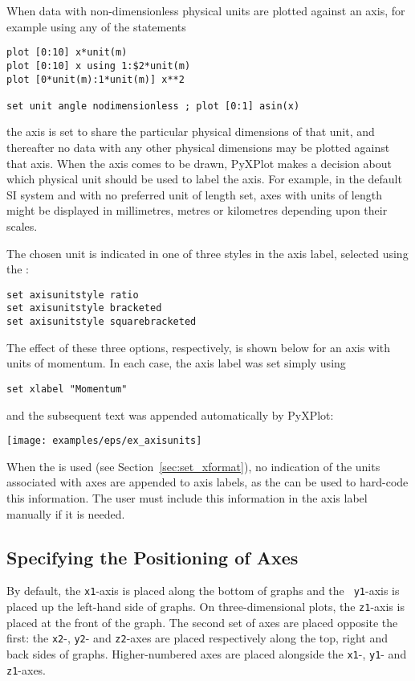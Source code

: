 When data with non-dimensionless physical units are plotted against an axis,
for example using any of the statements
\begin{verbatim}
plot [0:10] x*unit(m)
plot [0:10] x using 1:$2*unit(m)
plot [0*unit(m):1*unit(m)] x**2

set unit angle nodimensionless ; plot [0:1] asin(x)
\end{verbatim}
the axis is set to share the particular physical dimensions of that unit, and
thereafter no data with any other physical dimensions may be plotted against
that axis. When the axis comes to be drawn, PyXPlot makes a decision about
which physical unit should be used to label the axis. For example, in the
default SI system and with no preferred unit of length set, axes with units of
length might be displayed in millimetres, metres or kilometres depending upon
their scales.

The chosen unit is indicated in one of three styles in the axis label, selected
using the :
\begin{verbatim}
set axisunitstyle ratio
set axisunitstyle bracketed
set axisunitstyle squarebracketed
\end{verbatim}
The effect of these three options, respectively, is shown below for an axis
with units of momentum. In each case, the axis label was set simply using
\begin{verbatim}
set xlabel "Momentum"
\end{verbatim}
and the subsequent text was appended automatically by PyXPlot:

\vspace{3mm}
\centerline{\texttt{[image: examples/eps/ex\_axisunits]}}
\vspace{3mm}

When the  is used (see Section~\ref{sec:set_xformat}), no
indication of the units associated with axes are appended to axis labels, as
the  can be used to hard-code this information. The user
must include this information in the axis label manually if it is needed.

\subsection{Specifying the Positioning of Axes}

By default, the {\tt x1}-axis is placed along the bottom of graphs and the {\tt
y1}-axis is placed up the left-hand side of graphs. On three-dimensional plots,
the {\tt z1}-axis is placed at the front of the graph. The second set of axes
are placed opposite the first: the {\tt x2}-, {\tt y2}- and {\tt z2}-axes are
placed respectively along the top, right and back sides of graphs.
Higher-numbered axes are placed alongside the {\tt x1}-, {\tt y1}- and {\tt
z1}-axes.


